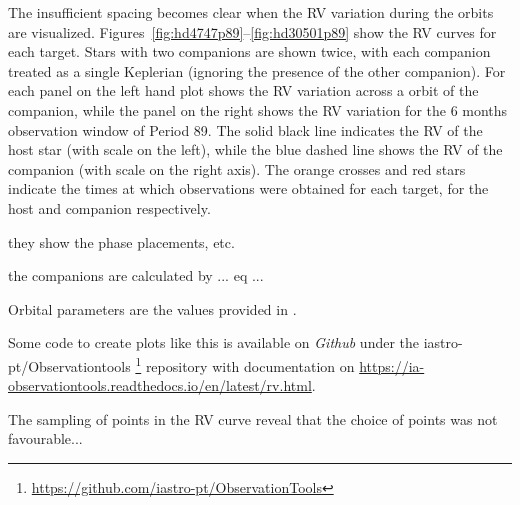 The insufficient spacing becomes clear when the RV variation during the orbits are visualized. Figures~\ref{fig:hd4747p89}--\ref{fig:hd30501p89} show the RV curves for each target.
Stars with two companions are shown twice, with each companion treated as a single Keplerian (ignoring the presence of the other companion).
For each panel on the left hand plot shows the RV variation across a orbit of the companion, while the panel on the right shows the RV variation for the 6 months observation window of Period 89.
The solid black line indicates the RV of the host star (with scale on the left), while the blue dashed line shows the RV of the companion (with scale on the right axis).
The orange crosses and red stars indicate the times at which observations were obtained for each target, for the host and companion respectively.

they show the phase placements, etc.

the companions are calculated by ... eq ...

Orbital parameters are the values provided in .

Some code to create plots like this is available on \textit{Github} under the iastro-pt/Observationtools \footnote{\href{https://github.com/iastro-pt/ObservationTools}{https://github.com/iastro-pt/ObservationTools}} repository with documentation on \href{Read the Docs}{https://ia-observationtools.readthedocs.io/en/latest/rv.html}.



The sampling of points in the RV curve reveal that the choice of points was not favourable...


